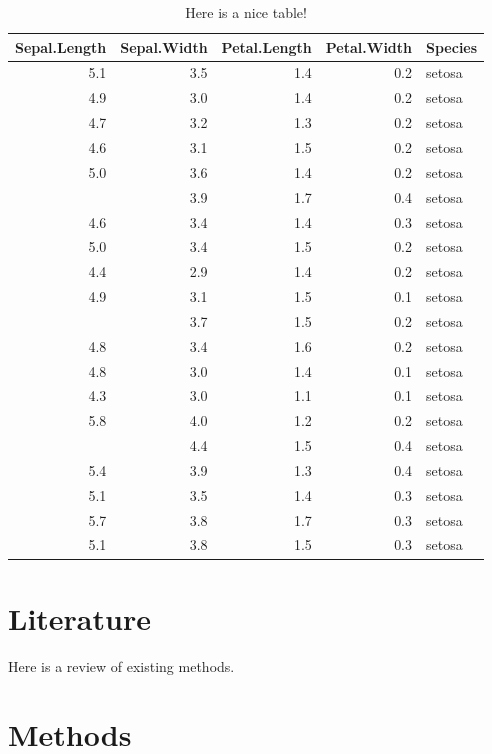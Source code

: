 \documentclass[]{book}
\begin{document}
\begin{table}

\caption{\label{tab:nice-tab}Here is a nice table!}
\centering
\begin{tabular}[t]{rrrrl}
\toprule
Sepal.Length & Sepal.Width & Petal.Length & Petal.Width & Species\\
\midrule
5.1 & 3.5 & 1.4 & 0.2 & setosa\\
4.9 & 3.0 & 1.4 & 0.2 & setosa\\
4.7 & 3.2 & 1.3 & 0.2 & setosa\\
4.6 & 3.1 & 1.5 & 0.2 & setosa\\
5.0 & 3.6 & 1.4 & 0.2 & setosa\\
\addlinespace
5.4 & 3.9 & 1.7 & 0.4 & setosa\\
4.6 & 3.4 & 1.4 & 0.3 & setosa\\
5.0 & 3.4 & 1.5 & 0.2 & setosa\\
4.4 & 2.9 & 1.4 & 0.2 & setosa\\
4.9 & 3.1 & 1.5 & 0.1 & setosa\\
\addlinespace
5.4 & 3.7 & 1.5 & 0.2 & setosa\\
4.8 & 3.4 & 1.6 & 0.2 & setosa\\
4.8 & 3.0 & 1.4 & 0.1 & setosa\\
4.3 & 3.0 & 1.1 & 0.1 & setosa\\
5.8 & 4.0 & 1.2 & 0.2 & setosa\\
\addlinespace
5.7 & 4.4 & 1.5 & 0.4 & setosa\\
5.4 & 3.9 & 1.3 & 0.4 & setosa\\
5.1 & 3.5 & 1.4 & 0.3 & setosa\\
5.7 & 3.8 & 1.7 & 0.3 & setosa\\
5.1 & 3.8 & 1.5 & 0.3 & setosa\\
\bottomrule
\end{tabular}
\end{table}

\hypertarget{literature}{%
\chapter{Literature}\label{literature}}

Here is a review of existing methods.

\hypertarget{methods}{%
\chapter{Methods}\label{methods}}
\end{document}
